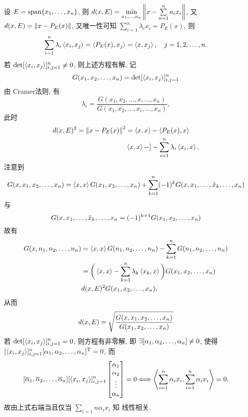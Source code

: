 	设 $ E=\operatorname{span}\{ x_{1}, \dots, x_{n} \} $, 则 $ d(x, E)=\min\limits_{a_{1}, \dots, a_{n} }\left\| x-\sum\limits_{n=1}^{n}a_{i}x_{i} \right\| $, 又 $ d(x, E)=\left\| x-P_{E}(x) \right\| $, 又唯一性可知 $ \sum\limits_{i=1}^{n}\lambda_{i}x_{i}=P_{E}(x) $, 则
	\[
		\sum_{i=1}^{n}\lambda_{i}\left\langle x_{i}, x_{j} \right\rangle=\left\langle P_{E}(x), x_{j} \right\rangle=\left\langle x, x_{j} \right\rangle, \quad j = 1, 2, \dots, n.
	\]
	若 $ \det[\left\langle x_{i}, x_{j} \right\rangle]_{i, j=1}^{n}\ne 0 $, 则上述方程有解, 记
	\[
		G(x_{1}, x_{2}, \dots, x_{n})=\det[\left\langle x_{i}, x_{j} \right\rangle]_{i, j=1}^{n}
	\]
	由 Cramer法则, 有
	\[
		\lambda_{i}=\frac{G(x_{1}, x_{2}, \dots, x, \dots, x_{n})}{G(x_{1}, x_{2}, \dots, x_{i}, \dots, x_{n})},
	\]
	此时
	\[
		\begin{aligned}
			d(x, E)^{2}=\left\| x-P_{E}(x) \right\|^{2} & =\left\langle x, x \right\rangle-\left\langle P_{E}(x), x \right\rangle\\
			& \left\langle x, x \right\rangle-]-\sum_{i=1}^{n}\lambda_{i}\left\langle x_{i}, x \right\rangle,
		\end{aligned}
	\]
	注意到
	\[
		G(x, x_{1}, x_{2}, \dots, x_{n})=\left\langle x, x \right\rangle G(x_{1}, x_{2}, \dots, x_{n})+\sum_{k=1}^{n}(-1)^{k}G(x, x_{1}, \dots, \hat{x}_{k}, \dots, x_{n}) 
	\]
	与
	\[
		G(x, x_{1}, \dots, \hat{x}_{k}, \dots, x_{n}=(-1)^{k+1}G(x_{1}, x_{2}, \dots, x_{n})
	\] 
	故有
	\[
		\begin{aligned}
			G(x, n_{1}, n_{2}, \dots, n_{n}) & =\left\langle x, x \right\rangle G(n_{1}, n_{2}, \dots, n_{n})-\sum_{k=1}^{n}G(n_{1}, n_{2}, \dots, n_{n}) \\
			& = \bigg( \left\langle x, x \right\rangle-\sum_{k=1}^{n}\lambda_{k}\left\langle x_{k}, x \right\rangle \bigg)G(x_{1}, x_{2}, \dots, x_{n})\\
			& d(x, E)^{2}G(x_{1}, x_{2}, \dots, x_{n}),
		\end{aligned}
	\]
	从而
	\[
		d(x, E)=\sqrt{\frac{G(x, x_{1}, x_{2}, \dots, x_{n})}{G(x_{1}, x_{2}, \dots, x_{n})}}
	\]
	若 $ \det[\left\langle x_{i}, x_{j} \right\rangle]_{i, j=1}^{n}=0 $, 则方程有非零解, 即 $ \exists[\alpha_{1}, \alpha_{2}, \dots, \alpha_{n}]\ne0 $, 使得 $ [\left\langle x_{i}, x_{j} \right\rangle]_{i, j=1}^{n}[\alpha_{1}, \alpha_{2}, \dots, \alpha_{n}]^{\textrm{T}}=0 $, 而
	\[
		[\overline{\alpha}_{1}, \overline{\alpha}_{2}, \dots, \overline{\alpha}_{n}][\left\langle x_{i}, x_{j} \right\rangle]_{i, j=1}^{n}\begin{bmatrix}
			\alpha_{1}\\\alpha_{2}\\\vdots\\\alpha_{n}
		\end{bmatrix}=0\Longleftrightarrow \left\langle \sum_{i=1}^{n}\alpha_{i}x_{i}, \sum_{i=1}^{n}\alpha_{i}x_{i} \right\rangle=0,
	\]
	故由上式右端当且仅当 $ \sum\limits_{i=1}{n}\alpha_{i}x_{i} $ 知  线性相关.
	
